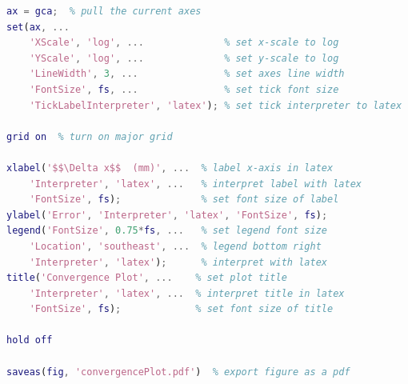 \begin{lstlisting}[language=matlab]
ax = gca;  % pull the current axes
set(ax, ...
    'XScale', 'log', ...              % set x-scale to log
    'YScale', 'log', ...              % set y-scale to log
    'LineWidth', 3, ...               % set axes line width
    'FontSize', fs, ...               % set tick font size
    'TickLabelInterpreter', 'latex'); % set tick interpreter to latex

grid on  % turn on major grid

xlabel('$$\Delta x$$  (mm)', ...  % label x-axis in latex
    'Interpreter', 'latex', ...   % interpret label with latex
    'FontSize', fs);              % set font size of label
ylabel('Error', 'Interpreter', 'latex', 'FontSize', fs);
legend('FontSize', 0.75*fs, ...   % set legend font size
    'Location', 'southeast', ...  % legend bottom right
    'Interpreter', 'latex');      % interpret with latex
title('Convergence Plot', ...    % set plot title
    'Interpreter', 'latex', ...  % interpret title in latex
    'FontSize', fs);             % set font size of title

hold off

saveas(fig, 'convergencePlot.pdf')  % export figure as a pdf




\end{lstlisting}

